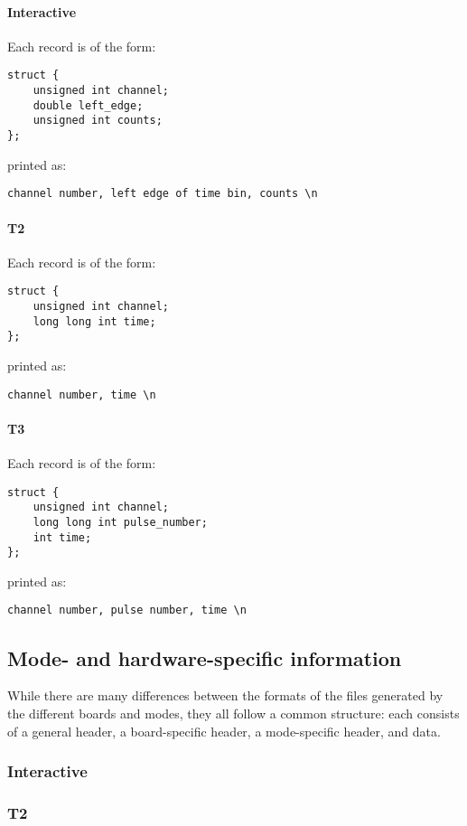 \documentclass{article}
\begin{document}
\paragraph{Interactive}
Each record is of the form:
\begin{verbatim}
struct {
    unsigned int channel;
    double left_edge;
    unsigned int counts;
};
\end{verbatim}
printed as:
\begin{verbatim}
channel number, left edge of time bin, counts \n
\end{verbatim}

\paragraph{T2}
Each record is of the form:
\begin{verbatim}
struct {
	unsigned int channel;
	long long int time;
};
\end{verbatim}
printed as:
\begin{verbatim}
channel number, time \n
\end{verbatim}

\paragraph{T3}
Each record is of the form:
\begin{verbatim}
struct {
	unsigned int channel;
	long long int pulse_number;
	int time;
};
\end{verbatim}
printed as:
\begin{verbatim}
channel number, pulse number, time \n
\end{verbatim}
	

\subsection{Mode- and hardware-specific information}
\label{sec:formats}

While there are many differences between the formats of the files generated by the different boards and modes, they all follow a common structure: each consists of a general header, a board-specific header, a mode-specific header, and data. 

\subsubsection{Interactive}
\subsubsection{T2}
\end{document}
